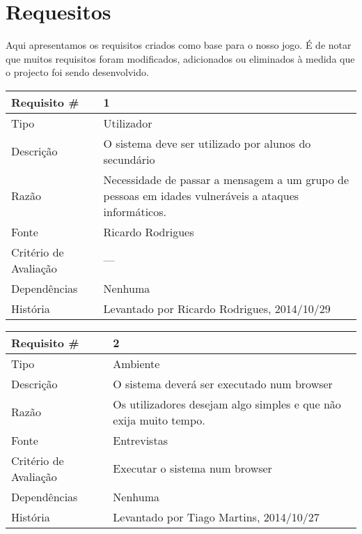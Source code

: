 
\section{Requesitos}
\label{att:requir}

Aqui apresentamos os requisitos criados como base para o nosso jogo.
É de notar que muitos requisitos foram modificados, adicionados ou eliminados à medida que o projecto foi sendo desenvolvido.

\begin{tabular} {|l|p{8cm}|} 
\hline
Requisito \# & 1 \\
\hline
Tipo & Utilizador\\
\hline
Descrição & O sistema deve ser utilizado por alunos do secundário \\
\hline
Razão & Necessidade de passar a mensagem a um grupo de pessoas em idades vulneráveis a ataques informáticos. \\
\hline
Fonte & Ricardo Rodrigues \\
\hline
Critério de Avaliação & --- \\
\hline
Dependências & Nenhuma \\
\hline
História & Levantado por Ricardo Rodrigues, 2014/10/29 \\
\hline
\end{tabular}

\begin{tabular} {|l|p{8cm}|} 
\hline
Requisito \# & 2 \\
\hline
Tipo & Ambiente \\
\hline
Descrição & O sistema deverá ser executado num browser \\
\hline
Razão & Os utilizadores desejam algo simples e que não exija muito tempo. \\
\hline
Fonte & Entrevistas \\
\hline
Critério de Avaliação & Executar o sistema num browser \\
\hline
Dependências & Nenhuma \\
\hline
História & Levantado por Tiago Martins, 2014/10/27 \\
\hline
\end{tabular}

